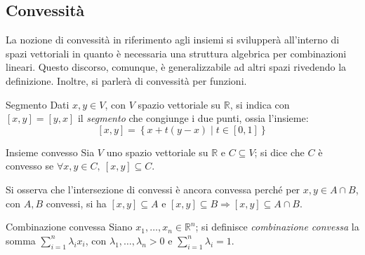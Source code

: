 \documentclass[11pt, a4paper]{scrartcl}
\theoremstyle{definition}
\numberwithin{esempio}{section}
\theoremstyle{definition}
\numberwithin{obs}{section}
\numberwithin{nota}{section}
\numberwithin{equation}{subsection}
\begin{document}
\subsection{Convessit\`a}
La nozione di convessit\`a in riferimento agli insiemi si svilupper\`a all'interno di spazi vettoriali in quanto \`e necessaria una struttura algebrica per combinazioni lineari.
Questo discorso, comunque, \`e generalizzabile ad altri spazi rivedendo la definizione. 
Inoltre, si parler\`a di convessit\`a per funzioni.
\begin{definizione}
	{Segmento}{}
	Dati $x,y \in V$, con $V$ spazio vettoriale su $\mathbb{R}$, si indica con $[x,y] = [y,x]$ il \textit{segmento} che congiunge i due punti, ossia l'insieme:
	\[
		[x,y] = \left\{ x + t(y-x)  \mid t \in [0,1] \right\} 
	\] 
\end{definizione}
\begin{definizione}
	{Insieme convesso}{}
	Sia $V$ uno spazio vettoriale su $\mathbb{R}$ e $C \subseteq V$; si dice che $C$ \`e convesso se $\forall x,y \in C, \ [x,y] \subseteq C$.
\end{definizione}
Si osserva che l'intersezione di convessi \`e ancora convessa perch\'e per $x,y \in A \cap B$, con $A, B$ convessi, si ha $[x,y] \subseteq A$ e $[x,y] \subseteq B \Rightarrow  [x,y] \subseteq A \cap B$.

\begin{definizione}
	{Combinazione convessa}{}
	Siano $x_1,\ldots,x_n \in \mathbb{R}^n$; si definisce \textit{combinazione convessa} la somma $\sum_{i=1}^{n} \lambda _i x_i$, con $\lambda _1,\ldots,\lambda _n >0$ e $\sum_{i=1}^{n} \lambda _i = 1$.
\end{definizione}
\end{document}
